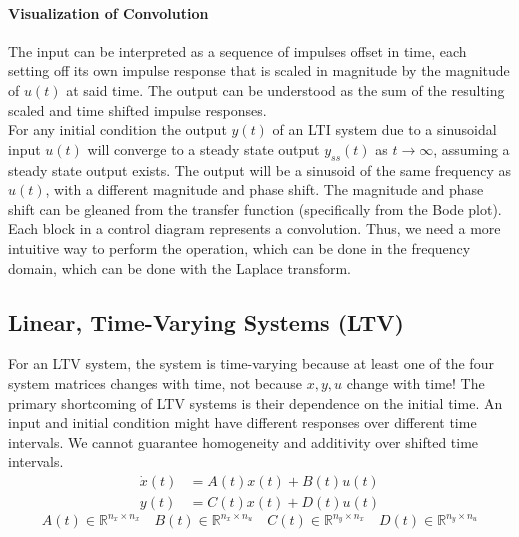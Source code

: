 \documentclass[../notes.tex]{subfiles}
\begin{document}
\paragraph{Visualization of Convolution}
The input can be interpreted as a sequence of impulses offset in time, each setting off its own impulse response that is scaled in magnitude by the magnitude of $u(t)$ at said time. The output can be understood as the sum of the resulting scaled and time shifted impulse responses. \\
For any initial condition the output $y(t)$ of an LTI system due to a sinusoidal input $u(t)$ will converge to a steady state output $y_{ss}(t)$ as $t\rightarrow\infty$, assuming a steady state output exists. The output will be a sinusoid of the same frequency as $u(t)$, with a different magnitude and phase shift. The magnitude and phase shift can be gleaned from the transfer function (specifically from the Bode plot).\\
Each block in a control diagram represents a convolution. Thus, we need a more intuitive way to perform the operation, which can be done in the frequency domain, which can be done with the Laplace transform.

\subsection{Linear, Time-Varying Systems (LTV)}
For an LTV system, the system is time-varying because at least one of the four system matrices changes with time, not because $x,y,u$ change with time! The primary shortcoming of LTV systems is their dependence on the initial time. An input and initial condition might have different responses over different time intervals. We cannot guarantee homogeneity and additivity over shifted time intervals.
\begin{align*}
    \dot{x}(t) &= A(t)x(t) + B(t)u(t) \\
    y(t) &= C(t)x(t) + D(t)u(t)
\end{align*}
\begin{equation*}
    A(t) \in \mathbb{R}^{n_x \times n_x} \quad
    B(t) \in \mathbb{R}^{n_x \times n_u} \quad
    C(t) \in \mathbb{R}^{n_y \times n_x} \quad
    D(t) \in \mathbb{R}^{n_y \times n_u} 
\end{equation*}
\end{document}
